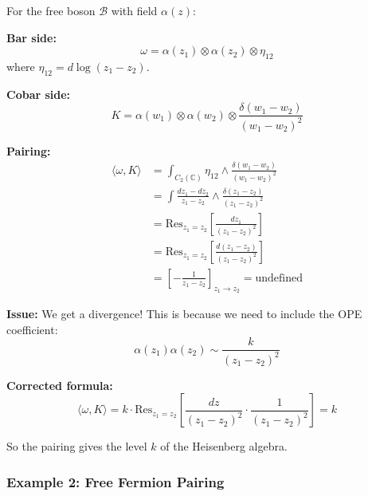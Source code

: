 \begin{example}\label{ex:heisenberg-2pt-pairing}
For the free boson $\mathcal{B}$ with field $\alpha(z)$:

\textbf{Bar side:}
$$\omega = \alpha(z_1) \otimes \alpha(z_2) \otimes \eta_{12}$$
where $\eta_{12} = d\log(z_1 - z_2)$.

\textbf{Cobar side:}
$$K = \alpha(w_1) \otimes \alpha(w_2) \otimes \frac{\delta(w_1 - w_2)}{(w_1 - w_2)^2}$$

\textbf{Pairing:}
\begin{align*}
\langle \omega, K \rangle &= \int_{C_2(\mathbb{C})} \eta_{12} \wedge \frac{\delta(w_1 - w_2)}{(w_1 - w_2)^2}\\
&= \int \frac{dz_1 - dz_2}{z_1 - z_2} \wedge \frac{\delta(z_1 - z_2)}{(z_1 - z_2)^2}\\
&= \text{Res}_{z_1 = z_2}\left[\frac{dz_1}{(z_1 - z_2)^2}\right]\\
&= \text{Res}_{z_1 = z_2}\left[\frac{d(z_1 - z_2)}{(z_1 - z_2)^2}\right]\\
&= \left[-\frac{1}{z_1 - z_2}\right]_{z_1 \to z_2} = \text{undefined}
\end{align*}

\textbf{Issue:} We get a divergence! This is because we need to include the OPE coefficient:
$$\alpha(z_1)\alpha(z_2) \sim \frac{k}{(z_1-z_2)^2}$$

\textbf{Corrected formula:}
$$\langle \omega, K \rangle = k \cdot \text{Res}_{z_1 = z_2}\left[\frac{dz}{(z_1-z_2)^2} \cdot 
\frac{1}{(z_1-z_2)^2}\right] = k$$

So the pairing gives the level $k$ of the Heisenberg algebra. \checkmark
\end{example}

\subsubsection{Example 2: Free Fermion Pairing}


